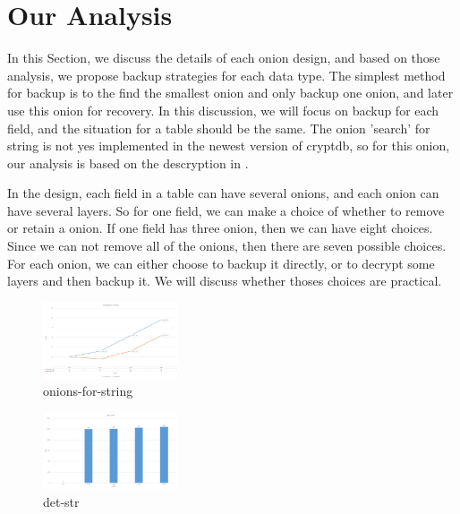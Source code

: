 \section{Our Analysis}

In this Section, we discuss the details of each onion design, and based on those analysis, we propose backup strategies for each data type. The simplest method for backup is to the find the smallest onion and only backup one onion, and later use this onion for recovery. In this discussion, we will focus on backup for each field, and the situation for a table should be the same. The onion 'search' for string is not yes implemented in the newest version of cryptdb, so for this onion, our analysis is based on the descryption in \citep{song2000practical}.

In the design, each field in a table can have several onions, and each onion can have several layers. So for one field, we can make a choice of whether to remove or retain a onion. If one field has three onion, then we can have eight choices. Since we can not remove all of the onions, then there are seven possible choices. For each onion, we can either choose to backup it directly, or to decrypt some layers and then backup it. We will discuss whether thoses choices are practical.

\begin{figure}[tb]
\centering
\includegraphics[width=4cm]{images/onions-for-string.png}
\caption{onions-for-string}
\label{fig:stack4}
\end{figure}


\begin{figure}[tb]
\centering
\includegraphics[width=4cm]{images/det-str.png}
\caption{det-str}
\label{fig:stack5}
\end{figure}



